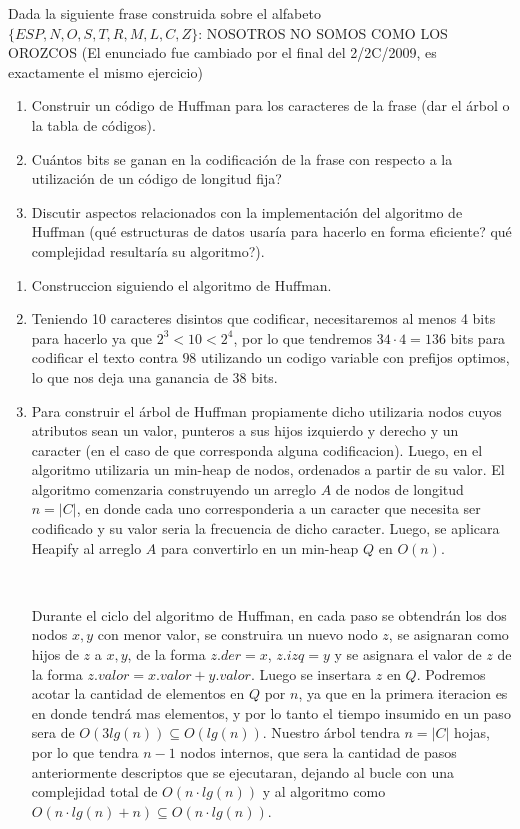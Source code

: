 \documentclass[10pt, a4paper]{article}
\begin{document}
Dada la siguiente frase construida sobre el alfabeto $\{ESP,N,O,S,T,R,M,L,C,Z\}$: NOSOTROS NO SOMOS COMO LOS OROZCOS
(El enunciado fue cambiado por el final del 2/2C/2009, es exactamente el mismo ejercicio)

\begin{enumerate}
 \item Construir un c\'odigo de Huffman para los caracteres de la frase (dar el \'arbol o la tabla de c\'odigos).
 \item Cu\'antos bits se ganan en la codificaci\'on de la frase con respecto a la utilizaci\'on de un c\'odigo de longitud fija?
 \item Discutir aspectos relacionados con la implementaci\'on del algoritmo de Huffman (qu\'e estructuras de datos usar\'ia para hacerlo en forma eficiente? qu\'e complejidad resultar\'ia su algoritmo?).
\end{enumerate}

\begin{enumerate}
 \item Construccion siguiendo el algoritmo de Huffman.
 \item Teniendo 10 caracteres disintos que codificar, necesitaremos al menos 4 bits para hacerlo ya que $2^3 < 10 < 2^4$, por lo que tendremos $34 \cdot 4 = 136$ bits para codificar el texto contra $98$ utilizando un codigo variable con prefijos optimos, lo que nos deja una ganancia de $38$ bits.
 \item Para construir el \'arbol de Huffman propiamente dicho utilizaria nodos cuyos atributos sean un valor, punteros a sus hijos izquierdo y derecho y un caracter (en el caso de que corresponda alguna codificacion). Luego, en el algoritmo utilizaria un min-heap de nodos, ordenados a partir de su valor. El algoritmo comenzaria construyendo un arreglo $A$ de nodos de longitud $n = |C|$, en donde cada uno corresponderia a un caracter que necesita ser codificado y su valor seria la frecuencia de dicho caracter. Luego, se aplicara Heapify al arreglo $A$ para convertirlo en un min-heap $Q$ en $O(n)$.
 
 ~
 
 Durante el ciclo del algoritmo de Huffman, en cada paso se obtendr\'an los dos nodos $x,y$ con menor valor, se construira un nuevo nodo $z$, se asignaran como hijos de $z$ a $x,y$, de la forma $z.der = x$, $z.izq = y$ y se asignara el valor de $z$ de la forma $z.valor = x.valor + y.valor$. Luego se insertara $z$ en $Q$. Podremos acotar la cantidad de elementos en $Q$ por $n$, ya que en la primera iteracion es en donde tendr\'a mas elementos, y por lo tanto el tiempo insumido en un paso sera de $O(3lg(n)) \subseteq O(lg(n))$. Nuestro \'arbol tendra $n = |C|$ hojas, por lo que tendra $n-1$ nodos internos, que sera la cantidad de pasos anteriormente descriptos que se ejecutaran, dejando al bucle con una complejidad total de $O(n \cdot lg(n))$ y al algoritmo como $O(n \cdot lg(n) + n) \subseteq O(n \cdot lg(n))$.
\end{enumerate}
\end{document}
